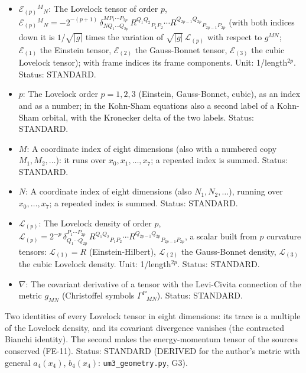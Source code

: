 \documentclass[
  10pt,
]{article}
\providecommand{\tightlist}{%
  \setlength{\itemsep}{0pt}\setlength{\parskip}{0pt}}
\begin{document}
\begin{itemize}
\tightlist
\item
  \(\mathcal{E}_{(p)}{}^M{}_N\): The Lovelock tensor of order \(p\),
  \(\mathcal{E}_{(p)}{}^M{}_N = -2^{-(p+1)}\,\delta^{MP_1\cdots P_{2p}}_{NQ_1\cdots Q_{2p}}\,R^{Q_1Q_2}{}_{P_1P_2}\cdots R^{Q_{2p-1}Q_{2p}}{}_{P_{2p-1}P_{2p}}\)
  (with both indices down it is \(1/\sqrt{\lvert g\rvert}\) times the
  variation of \(\sqrt{\lvert g\rvert}\,\mathcal{L}_{(p)}\) with respect
  to \(g^{MN}\); \(\mathcal{E}_{(1)}\) the Einstein tensor,
  \(\mathcal{E}_{(2)}\) the Gauss-Bonnet tensor, \(\mathcal{E}_{(3)}\)
  the cubic Lovelock tensor); with frame indices its frame components.
  Unit: 1/length\(^{2p}\). Status: STANDARD.
\item
  \(p\): The Lovelock order \(p = 1, 2, 3\) (Einstein, Gauss-Bonnet,
  cubic), as an index and as a number; in the Kohn-Sham equations also a
  second label of a Kohn-Sham orbital, with the Kronecker delta of the
  two labels. Status: STANDARD.
\item
  \(M\): A coordinate index of eight dimensions (also with a numbered
  copy \(M_1, M_2, \dots\)): it runs over \(x_0, x_1, \dots, x_7\); a
  repeated index is summed. Status: STANDARD.
\item
  \(N\): A coordinate index of eight dimensions (also
  \(N_1, N_2, \dots\)), running over \(x_0, \dots, x_7\); a repeated
  index is summed. Status: STANDARD.
\item
  \(\mathcal{L}_{(p)}\): The Lovelock density of order \(p\),
  \(\mathcal{L}_{(p)} = 2^{-p}\,\delta^{P_1\cdots P_{2p}}_{Q_1\cdots Q_{2p}}\,R^{Q_1Q_2}{}_{P_1P_2}\cdots R^{Q_{2p-1}Q_{2p}}{}_{P_{2p-1}P_{2p}}\),
  a scalar built from \(p\) curvature tensors: \(\mathcal{L}_{(1)} = R\)
  (Einstein-Hilbert), \(\mathcal{L}_{(2)}\) the Gauss-Bonnet density,
  \(\mathcal{L}_{(3)}\) the cubic Lovelock density. Unit:
  1/length\(^{2p}\). Status: STANDARD.
\item
  \(\nabla\): The covariant derivative of a tensor with the Levi-Civita
  connection of the metric \(g_{MN}\) (Christoffel symbols
  \(\Gamma^P{}_{MN}\)). Status: STANDARD.
\end{itemize}

Two identities of every Lovelock tensor in eight dimensions: its trace
is a multiple of the Lovelock density, and its covariant divergence
vanishes (the contracted Bianchi identity). The second makes the
energy-momentum tensor of the sources conserved (FE-11). Status:
STANDARD (DERIVED for the author's metric with general \(a_4(x_4)\),
\(b_4(x_4)\): \texttt{um3\_geometry.py}, G3).
\end{document}
